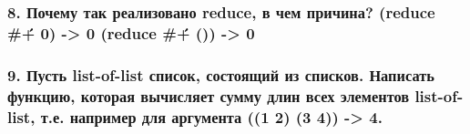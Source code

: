 \subsubsection*{8. Почему так реализовано reduce, в чем причина? \newline (reduce \#\' + 0) -> 0 \newline (reduce \#\' + ()) -> 0}

\subsubsection*{9. Пусть list-of-list список, состоящий из списков. Написать функцию, которая вычисляет сумму длин всех элементов list-of-list, т.е. например для аргумента ((1 2) (3 4)) -> 4.}

